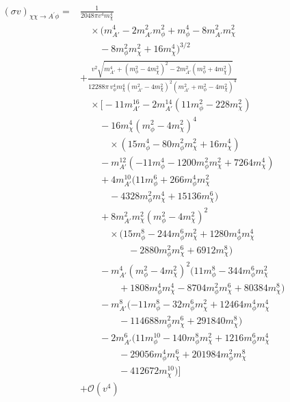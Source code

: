 \begin{align}
	(\sigma v)_{\chi\chi\to A^{\prime}\phi}
	= & \frac{1}{2048 \pi v^4 m_\chi^4} \nonumber \\
	& \quad \times (m_{A'}^4 - 2m_{A'}^2m_\phi^2 + m_\phi^4 -
	8m_{A'}^2m_\chi^2 \nonumber \\
	& \qquad - 8m_\phi^2m_\chi^2 + 16m_\chi^4)^{3/2} \nonumber \\
	& + \frac{v^2 \sqrt{m_{A'}^4 + (m_\phi^2 - 4m_\chi^2)^2 -
			2m_{A'}^2(m_\phi^2 + 4m_\chi^2)}}{12288 \pi \, v_\phi^4 m_\chi^4 (m_{A'}^2 - 4m_\chi^2)^2  (m_{A'}^2 + m_\phi^2 - 4m_\chi^2)^4} \nonumber \\ & \quad \times
	\Big[ -11m_{A'}^{16}  - 2m_{A'}^{14}(11m_\phi^2 - 228m_\chi^2) 
	\nonumber \\ & \qquad 
	- 16m_\chi^4(m_\phi^2 - 4m_\chi^2)^4 \nonumber \\ & \qquad \quad \times
	(15m_\phi^4 - 80m_\phi^2m_\chi^2 +
	16m_\chi^4) \nonumber \\ & \qquad
	- m_{A'}^{12}(-11m_\phi^4 -
	1200m_\phi^2m_\chi^2 + 7264m_\chi^4)
	\nonumber \\ & \qquad +
	4m_{A'}^{10}(11m_\phi^6 +
	266m_\phi^4m_\chi^2  \nonumber \\ & \qquad \quad -
	4328m_\phi^2m_\chi^4 + 15136m_\chi^6) \nonumber \\ & \qquad +
	8m_{A'}^2m_\chi^2
	(m_\phi^2 - 4m_\chi^2)^2  \nonumber \\ & \qquad \quad \times
	(15m_\phi^8 - 244m_\phi^6m_\chi^2 +
	1280m_\phi^4m_\chi^4   \nonumber \\ & \qquad \qquad \quad 
	-2880m_\phi^2m_\chi^6 + 6912m_\chi^8) \nonumber \\ & \qquad -
	m_{A'}^4(m_\phi^2 - 4m_\chi^2)^2
	(11m_\phi^8 - 344m_\phi^6m_\chi^2  \nonumber \\ & \qquad \qquad
	+ 1808m_\phi^4m_\chi^4 - 8704m_\phi^2m_\chi^6 + 80384m_\chi^8) \nonumber \\ & \qquad  -
	m_{A'}^8(-11m_\phi^8 -
	32m_\phi^6m_\chi^2 +
	12464m_\phi^4m_\chi^4  \nonumber \\ & \qquad \qquad
	- 114688m_\phi^2m_\chi^6 + 291840m_\chi^8) \nonumber \\ & \qquad  -
	2m_{A'}^6(11m_\phi^{10} -
	140m_\phi^8m_\chi^2 +
	1216m_\phi^6m_\chi^4 \nonumber \\ & \qquad \qquad -
	29056m_\phi^4m_\chi^6  +
	201984m_\phi^2m_\chi^8  \nonumber \\ & \qquad \qquad - 412672m_\chi^{10})\Big]\nonumber \\ &
	+ \mathcal{O}\left(v^4\right)
\end{align}
\unappendix
